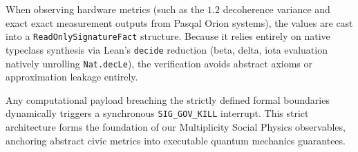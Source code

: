 \documentclass[aps,pra,preprint,superscriptaddress,11pt,floatfix]{revtex4-2}
\begin{document}
When observing hardware metrics (such as the $1.2$ decoherence variance and exact exact measurement outputs from Pasqal Orion systems), the values are cast into a \texttt{ReadOnlySignatureFact} structure. Because it relies entirely on native typeclass synthesis via Lean's \texttt{decide} reduction (beta, delta, iota evaluation natively unrolling \texttt{Nat.decLe}), the verification avoids abstract axioms or approximation leakage entirely. 

Any computational payload breaching the strictly defined formal boundaries dynamically triggers a synchronous \texttt{SIG\_GOV\_KILL} interrupt. This strict architecture forms the foundation of our Multiplicity Social Physics observables, anchoring abstract civic metrics into executable quantum mechanics guarantees.


\end{document}
